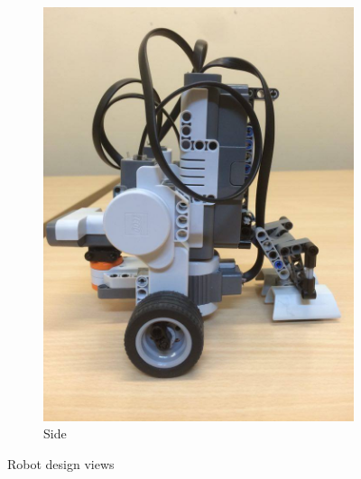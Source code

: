 \documentclass[12pt]{article}
\begin{document}
\begin{figure}[h!]
\begin{subfigure}[b]{0.3\textwidth}
		\includegraphics[width=\textwidth]{robot3}
		\caption{Side}
		\label{fig:side}
	\end{subfigure}
	\caption{Robot design views}\label{fig:robot}
\end{figure}
\end{document}
